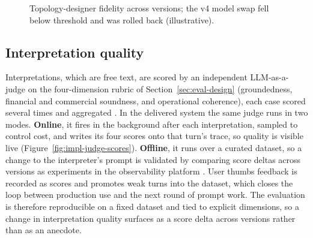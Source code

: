 \begin{figure}[H]
  \centering
  \caption{Topology-designer fidelity across versions; the v4 model swap fell below threshold and was rolled back (illustrative).}
  \label{fig:ged}
\end{figure}

\subsection{Interpretation quality}

Interpretations, which are free text, are scored by an independent LLM-as-a-judge
on the four-dimension rubric of Section~\ref{sec:eval-design} (groundedness,
financial and commercial soundness, and operational coherence), each case scored
several times and aggregated \cite{zheng2023judge}. In the delivered system the same
judge runs in two modes. \textbf{Online}, it fires in the background after each
interpretation, sampled to control cost, and writes its four scores onto that turn's
trace, so quality is visible live (Figure~\ref{fig:impl-judge-scores}).
\textbf{Offline}, it runs over a curated dataset, so a change to the interpreter's
prompt is validated by comparing score deltas across versions as experiments in the
observability platform \cite{langfuse2025}. User thumbs feedback is recorded as
scores and promotes weak turns into the dataset, which closes the loop between
production use and the next round of prompt work. The evaluation is therefore
reproducible on a fixed dataset and tied to explicit dimensions, so a change in
interpretation quality surfaces as a score delta across versions rather than as an
anecdote.

